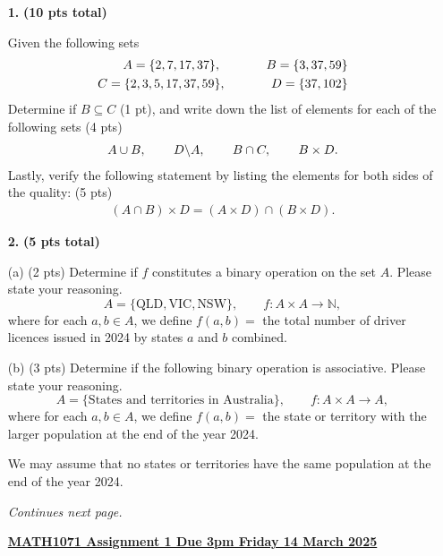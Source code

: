 \documentclass[12pt]{article}
\begin{document}
\begin{itemize}
\item[{\bf 1.}] {\bf (10 pts total)}

Given the following sets
\begin{align*}
A=\{2,7,17,37\}, \hspace{.5 in} B=\{3,37,59\}\\
C=\{2,3,5,17,37,59\}, \hspace{.5 in} D=\{37,102\}
\end{align*}
Determine if $B\subseteq C$ (1 pt), and write down the list of elements for each of the following sets (4 pts)
\begin{align*}
A\cup B,  \hspace{.3 in} D\backslash A, \hspace{.3 in} B\cap C, \hspace{.3 in} B\times D.
\end{align*}
Lastly, verify the following statement by listing the elements for both sides of the quality: (5 pts)
\begin{align*}
(A\cap B)\times D=(A\times D) \cap (B \times D).
\end{align*}


\vspace*{2mm} 


\item[{\bf 2.}] {\bf (5 pts total)}

(a) (2 pts) Determine if $f$ constitutes a binary operation on the set $A$. Please state your reasoning.
\[
	A=\{\text{QLD},\text{VIC},\text{NSW}\}, \qquad  f: A\times A\to \mathbb{N}, 
\] 
where for each $a,b\in A$, we define $f(a,b)=$ the total number of driver licences issued in 2024 by states $a$ and $b$ combined.

(b) (3 pts)  Determine if the following binary operation is associative. Please state your reasoning.
\[
	A=\{\text{States and territories in Australia}\}, \qquad  f: A\times A\to A, 
\] 
where for each $a,b\in A$, we define $f(a,b)=$ the state or territory with the larger population at the end of the year 2024. 

We may assume that no states or territories have the same population at the end of the year 2024.


\vspace*{2mm} 



\vspace*{\fill}
{\em Continues next page.}
\newpage

{\underline{\bf MATH1071 \hspace*{3.8cm} Assignment 1 
\hspace*{2cm} Due 3pm Friday 14 March 2025}}


\end{itemize}
\end{document}
